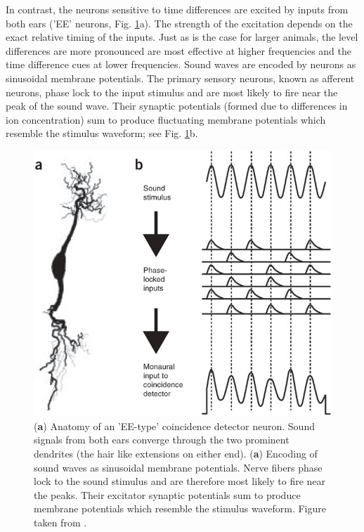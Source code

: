 In contrast, the neurons sensitive to time differences are excited by inputs from both ears ('EE' neurons, Fig. \ref{EEtypedetector}a). The strength of the
excitation depends on the exact relative timing of the inputs. Just as is the case for larger animals, the level
differences are more pronounced are most effective at higher frequencies and the time difference cues at lower frequencies. Sound waves are encoded
by neurons as sinusoidal membrane potentials. The primary sensory neurons, known as afferent neurons, phase lock to the input
stimulus and are most likely to fire near the peak of the sound wave. Their synaptic potentials (formed due to differences
in ion concentration) sum to produce fluctuating membrane potentials which resemble the stimulus waveform; see Fig. \ref{EEtypedetector}b. 
\begin{figure}[ht!]
 \centering
 \includegraphics[width=0.7\linewidth]{Diagrams/EEtypedetector.jpg}
 \caption[EE-type coincidence detector and encoding of sound waves as membrane potentials.]{(\textbf{a}) Anatomy of an 'EE-type'
 coincidence detector neuron. Sound signals from both ears converge through the two prominent dendrites (the hair like extensions
 on either end). (\textbf{a}) Encoding of sound waves as sinusoidal membrane potentials. Nerve fibers phase lock to the sound stimulus and
 are therefore most likely to fire near the peaks. Their excitator synaptic potentials sum to produce membrane potentials which resemble the
 stimulus waveform. Figure taken from \cite{schnuppcarr}.}
 \label{EEtypedetector}
\end{figure}

